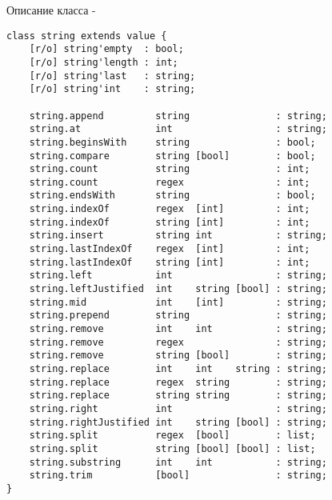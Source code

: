 \noindent Описание класса \str -
\begin{lstlisting}[numbers=none]
class string extends value {
    [r/o] string'empty  : bool;
    [r/o] string'length : int;
    [r/o] string'last   : string;
    [r/o] string'int    : string;

    string.append         string               : string;
    string.at             int                  : string;
    string.beginsWith     string               : bool;
    string.compare        string [bool]        : bool;
    string.count          string               : int;
    string.count          regex                : int;
    string.endsWith       string               : bool;
    string.indexOf        regex  [int]         : int;
    string.indexOf        string [int]         : int;
    string.insert         string int           : string;
    string.lastIndexOf    regex  [int]         : int;
    string.lastIndexOf    string [int]         : int;
    string.left           int                  : string;
    string.leftJustified  int    string [bool] : string;
    string.mid            int    [int]         : string;
    string.prepend        string               : string;
    string.remove         int    int           : string;
    string.remove         regex                : string;
    string.remove         string [bool]        : string;
    string.replace        int    int    string : string;
    string.replace        regex  string        : string;
    string.replace        string string        : string;
    string.right          int                  : string;
    string.rightJustified int    string [bool] : string;
    string.split          regex  [bool]        : list;
    string.split          string [bool] [bool] : list;
    string.substring      int    int           : string;
    string.trim           [bool]               : string;
}
\end{lstlisting}


